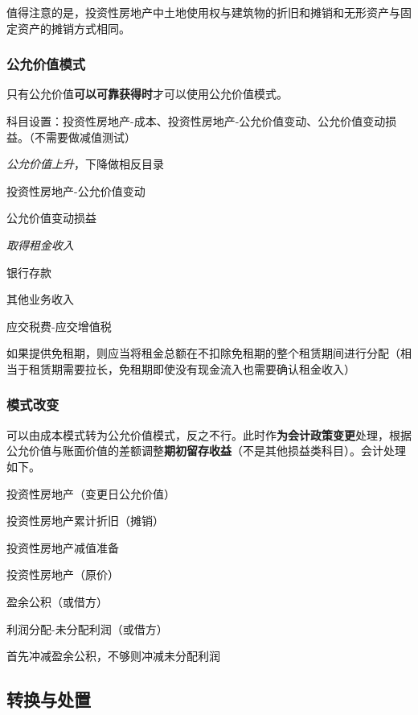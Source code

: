 \documentclass[UTF8,12pt]{ctexart}
\newenvironment{Dr}{%
	\begin{list}{}%
		{
			\setlength{\leftmargin}{2em}
			\setlength{\labelwidth}{2em}
			\setlength{\labelsep}{0pt}
			\setlength{\itemindent}{0pt}
			\setlength{\listparindent}{0pt}
			\setlength{\parsep}{0pt}
			\setlength{\topsep}{0pt}
		}
		\item[\textbf{借：}]
	}{%
	\end{list}
}
\newenvironment{Cr}{%
	\begin{list}{}%
		{
			\setlength{\leftmargin}{3em}
			\setlength{\labelwidth}{2em}
			\setlength{\labelsep}{0pt}
			\setlength{\itemindent}{0pt}
			\setlength{\listparindent}{0pt}
			\setlength{\parsep}{0pt}
			\setlength{\topsep}{0pt}
		}
		\item[\textbf{贷：}]
	}{%
	\end{list}
}
\numberwithin{equation}{section} %
\numberwithin{figure}{section}
\numberwithin{table}{section}
\begin{document}
	值得注意的是，投资性房地产中土地使用权与建筑物的折旧和摊销和无形资产与固定资产的摊销方式相同。
	
	\subsubsection{公允价值模式}
	只有公允价值\textbf{可以可靠获得时}才可以使用公允价值模式。
	
	科目设置：投资性房地产-成本、投资性房地产-公允价值变动、公允价值变动损益。（不需要做减值测试）
	
	\textit{公允价值上升}，下降做相反目录
	
	\begin{Dr}
		投资性房地产-公允价值变动
	\end{Dr}
	\begin{Cr}
		公允价值变动损益
	\end{Cr}

	\textit{取得租金收入}
	
	\begin{Dr}
		银行存款
	\end{Dr}
	\begin{Cr}
		其他业务收入
		
		应交税费-应交增值税
	\end{Cr}
	
	如果提供免租期，则应当将租金总额在不扣除免租期的整个租赁期间进行分配（相当于租赁期需要拉长，免租期即使没有现金流入也需要确认租金收入）
	
	\subsubsection{模式改变}
	可以由成本模式转为公允价值模式，反之不行。此时作\textbf{为会计政策变更}处理，根据公允价值与账面价值的差额调整\textbf{期初留存收益}（不是其他损益类科目）。会计处理如下。
	
	\begin{Dr}
		投资性房地产（变更日公允价值）
		
		投资性房地产累计折旧（摊销）
		
		投资性房地产减值准备
	\end{Dr}
	\begin{Cr}
		投资性房地产（原价）
		
		盈余公积（或借方）
		
		利润分配-未分配利润（或借方）
	\end{Cr}

	首先冲减盈余公积，不够则冲减未分配利润
	
	\subsection{转换与处置}
\end{document}
